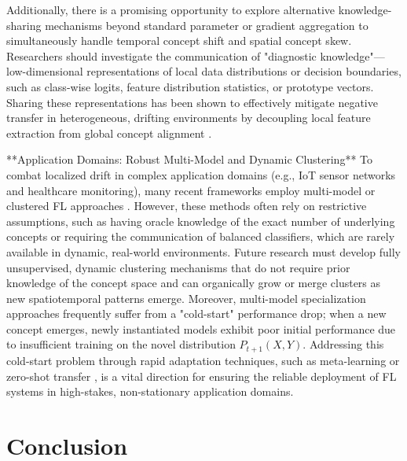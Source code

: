 \documentclass[journal]{IEEEtran}
\begin{document}
Additionally, there is a promising opportunity to explore alternative knowledge-sharing mechanisms beyond standard parameter or gradient aggregation to simultaneously handle temporal concept shift and spatial concept skew. Researchers should investigate the communication of "diagnostic knowledge"—low-dimensional representations of local data distributions or decision boundaries, such as class-wise logits, feature distribution statistics, or prototype vectors. Sharing these representations has been shown to effectively mitigate negative transfer in heterogeneous, drifting environments by decoupling local feature extraction from global concept alignment \cite{Jiang2024}. 

**Application Domains: Robust Multi-Model and Dynamic Clustering**
To combat localized drift in complex application domains (e.g., IoT sensor networks and healthcare monitoring), many recent frameworks employ multi-model or clustered FL approaches \cite{Liu2025}. However, these methods often rely on restrictive assumptions, such as having oracle knowledge of the exact number of underlying concepts or requiring the communication of balanced classifiers, which are rarely available in dynamic, real-world environments. Future research must develop fully unsupervised, dynamic clustering mechanisms that do not require prior knowledge of the concept space and can organically grow or merge clusters as new spatiotemporal patterns emerge. Moreover, multi-model specialization approaches frequently suffer from a "cold-start" performance drop; when a new concept emerges, newly instantiated models exhibit poor initial performance due to insufficient training on the novel distribution $P_{t+1}(X, Y)$. Addressing this cold-start problem through rapid adaptation techniques, such as meta-learning or zero-shot transfer \cite{paper412}, is a vital direction for ensuring the reliable deployment of FL systems in high-stakes, non-stationary application domains.

\section{Conclusion}
\label{sec:conclusion}
\end{document}
